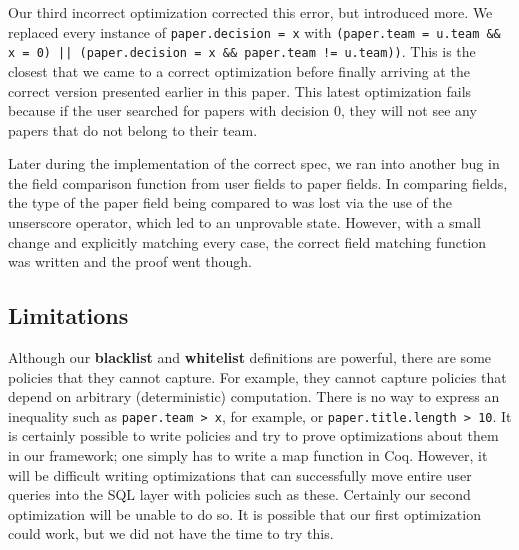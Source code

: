 \documentclass[11pt,journal]{IEEEtran}
\begin{document}
Our third incorrect optimization corrected this error, but introduced more.  We replaced every instance of \texttt{paper.decision = x} with \texttt{(paper.team = u.team \&\& x = 0) || (paper.decision = x \&\& paper.team != u.team))}.  This is the closest that we came to a correct optimization before finally arriving at the correct version presented earlier in this paper.  This latest optimization fails because if the user searched for papers with decision $0$, they will not see any papers that do not belong to their team. 

Later during the implementation of the correct spec, we ran into another bug in the field comparison function from user fields to paper fields. In comparing fields, the type of the paper field being compared to was lost via the use of the unserscore operator, which led to an unprovable state. However, with a small change and explicitly matching every case, the correct field matching function was written and the proof went though. 

\subsection{Limitations}
\label{sec:limitations}
Although our \textbf{blacklist} and \textbf{whitelist} definitions are powerful, there are some policies that they cannot capture.  For example, they cannot capture policies that depend on arbitrary (deterministic) computation.  There is no way to express an inequality such as \texttt{paper.team > x}, for example, or \texttt{paper.title.length > 10}.  It is certainly possible to write policies and try to prove optimizations about them in our framework; one simply has to write a map function in Coq.  However, it will be difficult writing optimizations that can successfully move entire user queries into the SQL layer with policies such as these.  Certainly our second optimization will be unable to do so.  It is possible that our first optimization could work, but we did not have the time to try this.
\end{document}
